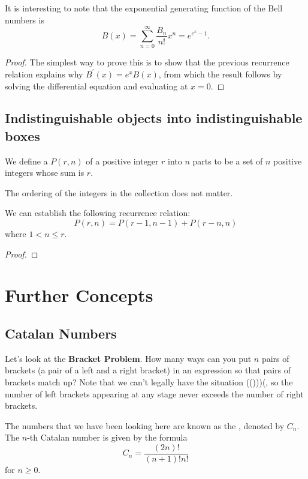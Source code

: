 It is interesting to note that the exponential generating function of the Bell numbers is
\[B(x)=\sum_{n=0}^\infty\frac{B_n}{n!}x^n=e^{e^x-1}.\]

\begin{proof}
The simplest way to prove this is to show that the previous recurrence relation explains why $B^\prime(x)=e^x B(x)$, from which the result follows by solving the differential equation and evaluating at $x=0$.
\end{proof}

\subsection{Indistinguishable objects into indistinguishable boxes}
\begin{definition}
We define a  $P(r,n)$ of a positive integer $r$ into $n$ parts to be a set of $n$ positive integers whose sum is $r$.
\end{definition}

\begin{remark}
The ordering of the integers in the collection does not matter.
\end{remark}

We can establish the following recurrence relation:
\begin{equation}
P(r,n)=P(r-1,n-1)+P(r-n,n)
\end{equation}
where $1<n\le r$.

\begin{proof}

\end{proof}
\pagebreak

\section{Further Concepts}
\subsection{Catalan Numbers}
Let's look at the \textbf{Bracket Problem}. How many ways can you put $n$ pairs of brackets (a pair of a left and a right bracket) in an expression so that pairs of brackets match up? Note that we can't legally have the situation (()))(, so the number of left brackets appearing at any stage never exceeds the number of right brackets.

The numbers that we have been looking here are known as the , denoted by $C_n$. The $n$-th Catalan number is given by the formula
\begin{equation}
C_n=\frac{(2n)!}{(n+1)!n!}
\end{equation}
for $n\ge0$.

